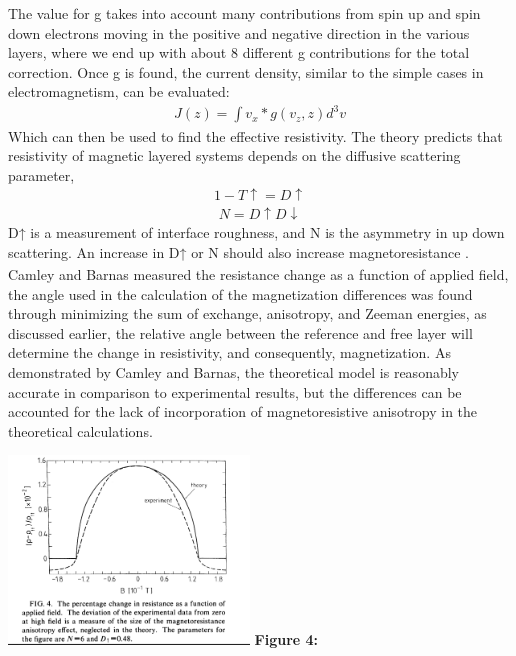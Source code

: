 \documentclass[11pt]{article}
\begin{document}
\begin{multicols}{2}
The value for g takes into account many contributions from spin up and spin down electrons moving in the positive and negative direction in the various layers, where we end up with about 8 different g contributions for the total correction. Once g is found, the current density, similar to  the simple cases in electromagnetism,  can be evaluated:
\begin{align*}
J(z) = \int v_x*g(v_z,z)d^3 v  
\end{align*}
Which can then be used to find the effective resistivity. The theory predicts that resistivity of magnetic layered systems depends on the diffusive scattering parameter, 
\begin{align*}
1-T \uparrow= D \uparrow
\end{align*}
\begin{align*}
N = D \uparrow D \downarrow 
\end{align*}
D↑ is a measurement of interface roughness, and N is the asymmetry in up down scattering. An increase in D↑ or N should also increase magnetoresistance \textsubscript{\cite{label2}}. Camley and Barnas measured the resistance change as a function of applied field, the angle used in the calculation of the magnetization differences was found through minimizing the sum of exchange, anisotropy, and Zeeman energies, as discussed earlier, the relative angle between the reference and free layer will determine the change in resistivity, and consequently, magnetization. As demonstrated by Camley and Barnas, the theoretical model is reasonably accurate in comparison to experimental results, but the differences can be accounted for the lack of incorporation of magnetoresistive anisotropy in the theoretical calculations. 

\begin{center}
	\centering
	\includegraphics[width=0.48\textwidth]{exp_vs_theory.png}
	{\footnotesize\textbf{Figure 4:}\textsubscript{\cite{label6}}}
\end{center} 



\end{multicols}
\end{document}
